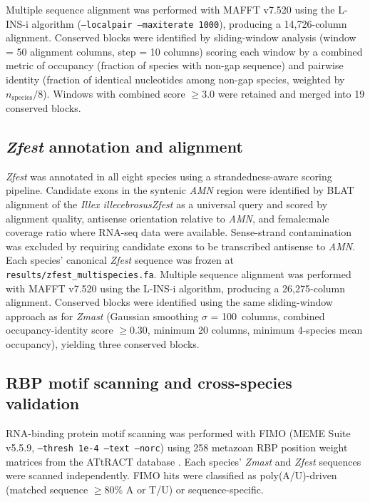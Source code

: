 \documentclass[12pt]{article}
\newcommand{\citep}{\parencite}
\newcommand{\illex}{\textit{Illex illecebrosus}\xspace}
\begin{document}
Multiple sequence alignment was performed with MAFFT v7.520
using the L-INS-i algorithm
(\texttt{--localpair --maxiterate 1000}),
producing a 14,726-column alignment.
Conserved blocks were identified by sliding-window analysis
(window = 50 alignment columns, step = 10 columns)
scoring each window by a combined metric of
occupancy (fraction of species with non-gap sequence)
and pairwise identity (fraction of identical nucleotides
among non-gap species, weighted by $n_\text{species}/8$).
Windows with combined score $\geq$3.0 were retained
and merged into 19 conserved blocks.

\subsection*{\textit{Zfest} annotation and alignment}

\textit{Zfest} was annotated in all eight species
using a strandedness-aware scoring pipeline.
Candidate exons in the syntenic \textit{AMN} region
were identified by BLAT alignment of
the \illex \textit{Zfest} as a universal query
and scored by alignment quality, antisense orientation
relative to \textit{AMN},
and female:male coverage ratio where RNA-seq data were available.
Sense-strand contamination was excluded
by requiring candidate exons to be transcribed antisense to \textit{AMN}.
Each species' canonical \textit{Zfest} sequence was frozen
at \texttt{results/zfest\_multispecies.fa}.
Multiple sequence alignment was performed with MAFFT v7.520
using the L-INS-i algorithm,
producing a 26,275-column alignment.
Conserved blocks were identified using the same sliding-window approach
as for \textit{Zmast}
(Gaussian smoothing $\sigma$ = 100~columns,
combined occupancy-identity score $\geq$0.30,
minimum 20 columns,
minimum 4-species mean occupancy),
yielding three conserved blocks.

\subsection*{RBP motif scanning and cross-species validation}

RNA-binding protein motif scanning was performed with FIMO
(MEME Suite v5.5.9, \texttt{--thresh 1e-4 --text --norc})
using 258 metazoan RBP position weight matrices
from the ATtRACT database \citep{giudice2016attract}.
Each species' \textit{Zmast} and \textit{Zfest} sequences were scanned independently.
FIMO hits were classified as poly(A/U)-driven
(matched sequence $\geq$80\% A or T/U)
or sequence-specific.
\end{document}
